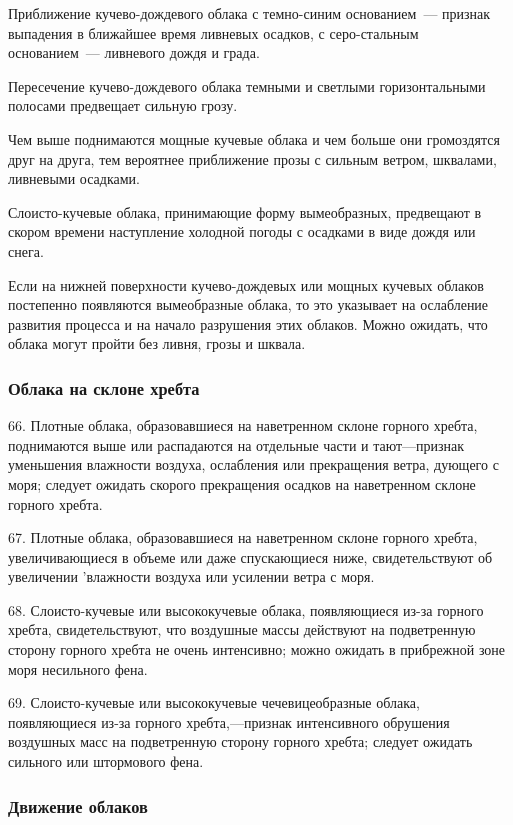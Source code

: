  Приближение кучево-дождевого облака с темно-синим основанием~---
признак выпадения в ближайшее время ливневых осадков, с серо-стальным
основанием~--- ливневого дождя и града.

 Пересечение кучево-дождевого облака темными и светлыми
горизонтальными полосами предвещает сильную грозу.

 Чем выше поднимаются мощные кучевые облака и чем больше они
громоздятся друг на друга, тем вероятнее приближение прозы с сильным
ветром, шквалами, ливневыми осадками.

 Слоисто-кучевые облака, принимающие форму вымеобразных,
предвещают в скором времени наступление холодной погоды с осадками в
виде дождя или снега.

 Если на нижней поверхности кучево-дождевых или мощных кучевых
облаков постепенно появляются вымеобразные облака, то это указывает на
ослабление развития процесса и на начало разрушения этих
облаков. Можно ожидать, что облака могут пройти без ливня, грозы и
шквала.

\subsubsection{Облака на склоне хребта}

66. Плотные облака, образовавшиеся на наветренном склоне горного хребта, поднимаются выше или распадаются на отдельные части и тают—признак уменьшения влажности воздуха, ослабления или прекращения ветра, дующего с моря; следует ожидать скорого прекращения осадков на наветренном склоне горного хребта.

67. Плотные облака, образовавшиеся на наветренном склоне горного хребта, увеличивающиеся в объеме или даже спускающиеся ниже, свидетельствуют об увеличении 'влажности воздуха или усилении ветра с моря.

68. Слоисто-кучевые или высококучевые облака, появляющиеся из-за горного хребта, свидетельствуют, что воздушные массы действуют на подветренную сторону горного хребта не очень интенсивно; можно ожидать в прибрежной зоне моря несильного фена.

69. Слоисто-кучевые или высококучевые чечевицеобразные облака, появляющиеся из-за горного хребта,—признак интенсивного обрушения воздушных масс на подветренную сторону горного хребта; следует ожидать сильного или штормового фена.

\subsubsection{Движение облаков}

